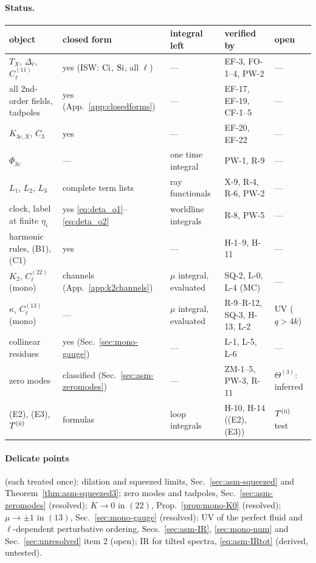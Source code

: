 \paragraph{Status.}\mbox{}\par\noindent
{\footnotesize\setlength{\tabcolsep}{3pt}
\begin{tabular}{@{}p{}p{}p{}p{}p{}@{}}
\hline
object & closed form & integral left & verified by & open \\ \hline
$T_X$, $\Delta_\ell$, $C^{(11)}_\ell$ & yes (ISW: $\operatorname{Ci}$, $\operatorname{Si}$, all $\ell$) & --- & EF-3, FO-1--4, PW-2 & --- \\
all 2nd-order fields, tadpoles & yes (App.~\ref{app:closedforms}) & --- & EF-17, EF-19, CF-1--5 & --- \\
$K_{3c,X}$, $C_3$ & yes & --- & EF-20, EF-22 & --- \\
$\Phi_{3c}$ & --- & one time integral & PW-1, R-9 & --- \\
$L_1$, $L_2$, $L_3$ & complete term lists & ray functionals & X-9, R-4, R-6, PW-2 & --- \\
clock, label at finite $\eta_i$ & yes \eqref{eq:deta_o1}--\eqref{eq:deta_o2} & worldline integrals & R-8, PW-5 & --- \\
harmonic rules, (B1), (C1) & yes & --- & H-1--9, H-11 & --- \\
$K_2$, $C^{(22)}_\ell$ (mono) & channels (App.~\ref{app:k2channels}) & $\mu$ integral, evaluated & SQ-2, L-0, L-4 (MC) & --- \\
$\kappa$, $C^{(13)}_\ell$ (mono) & --- & $\mu$ integral, evaluated & R-9--R-12, SQ-3, H-13, L-2 & UV ($q>4k$) \\
collinear residues & yes (Sec.~\ref{sec:mono-gauge}) & --- & L-1, L-5, L-6 & --- \\
zero modes & classified (Sec.~\ref{sec:asm-zeromodes}) & --- & ZM-1--5, PW-3, R-11 & $\Theta^{(3)}$: inferred \\
(E2), (E3), $T^{\rm(ii)}$ & formulas & loop integrals & H-10, H-14 ((E2), (E3)) & $T^{\rm(ii)}$ test \\ \hline
\end{tabular}}

\paragraph{Delicate points} (each treated once): dilation and squeezed limits, Sec.~\ref{sec:asm-squeezed} and Theorem~\ref{thm:asm-squeezed3};
zero modes and tadpoles, Sec.~\ref{sec:asm-zeromodes} (resolved); $K\to0$ in $(22)$, Prop.~\ref{prop:mono-K0} (resolved); $\mu\to\pm1$ in $(13)$,
Sec.~\ref{sec:mono-gauge} (resolved); UV of the perfect fluid and $\ell$-dependent perturbative ordering, Secs.~\ref{sec:asm-IR}, \ref{sec:mono-num}
and Sec.~\ref{sec:unresolved} item 2 (open); IR for tilted spectra, \eqref{eq:asm-IRtot} (derived, untested).

